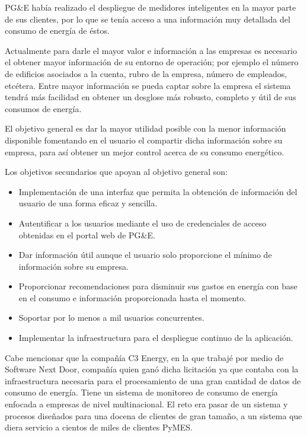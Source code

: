 \documentclass{article}
\begin{document}
PG\&E había realizado el despliegue de medidores inteligentes en la
mayor parte de sus clientes, por lo que se tenía acceso a una información
muy detallada del consumo de energía de éstos.

Actualmente para darle el mayor valor e información a las empresas
es necesario el obtener mayor información de su entorno de operación;
por ejemplo el número de edificios asociados a la cuenta, rubro
de la empresa, número de empleados, etcétera. Entre mayor información
se pueda captar sobre la empresa el sistema tendrá más facilidad
en obtener un desglose más robusto, completo y útil de sus
consumos de energía.

El objetivo general es dar la mayor utilidad posible con la menor
información disponible fomentando en el usuario el compartir dicha
información sobre su empresa, para así obtener un mejor control
acerca de su consumo energético.

\vspace{2.5mm}

Los objetivos secundarios que apoyan al objetivo general son:
\begin{itemize}
\item Implementación de una interfaz que permita la obtención
  de información del usuario de una forma eficaz y sencilla.
\item Autentificar a los usuarios mediante el uso de credenciales de acceso
  obtenidas en el portal web de PG\&E.
\item Dar información útil aunque el usuario solo proporcione el
  mínimo de información sobre su empresa.
\item Proporcionar recomendaciones para disminuir sus
  gastos en energía con base en el consumo e información proporcionada
  hasta el momento.
\item Soportar por lo menos a mil usuarios concurrentes.
\item Implementar la infraestructura para el despliegue continuo de la
  aplicación. 
\end{itemize}

Cabe mencionar que la compañía C3 Energy, en la que trabajé
por medio de Software Next Door, compañía quien ganó dicha licitación ya
que contaba con la infraestructura necesaria para el procesamiento
de una gran cantidad de datos de consumo de energía. Tiene un sistema
de monitoreo de consumo de energía enfocada a empresas de nivel
multinacional. El reto era pasar de un sistema y procesos diseñados
para una docena de clientes de gran tamaño, a un sistema que diera
servicio a cientos de miles de clientes PyMES.
\end{document}

